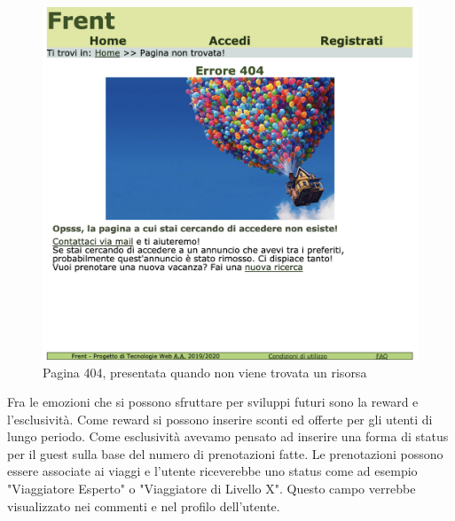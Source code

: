 \documentclass[1_relazione.tex]{subfiles}
\begin{document}
    \begin{figure}[h!]
        \centering
        \includegraphics[scale=0.25]{immagini/pagina404.png}
        \caption{Pagina 404, presentata quando non viene trovata un risorsa}
    \end{figure}
    Fra le emozioni che si possono sfruttare per sviluppi futuri sono la reward e l'esclusivit\`{a}. Come reward si possono inserire sconti ed offerte per gli utenti di lungo periodo. Come esclusivit\`{a} avevamo pensato ad inserire una forma di status per il guest sulla base del numero di prenotazioni fatte. Le prenotazioni possono essere associate ai viaggi e l'utente riceverebbe uno status come ad esempio "Viaggiatore Esperto" o "Viaggiatore di Livello X". Questo campo verrebbe visualizzato nei commenti e nel profilo dell'utente.
\end{document}
